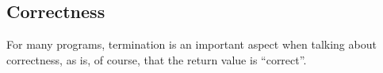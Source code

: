 \newsection
\subsection{Correctness}
For many programs, termination is an important aspect when talking about correctness,
as is, of course, that the return value is ``correct''.
